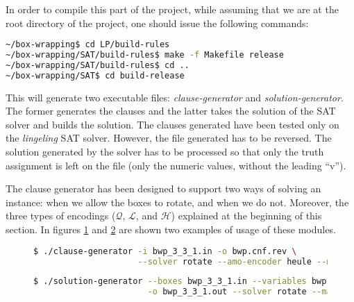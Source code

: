 In order to compile this part of the project, while assuming that we are at the
root directory of the project, one should issue the following commands:
\begin{lstlisting}[language=bash]
~/box-wrapping$ cd LP/build-rules
~/box-wrapping/SAT/build-rules$ make -f Makefile release
~/box-wrapping/SAT/build-rules$ cd ..
~/box-wrapping/SAT$ cd build-release
\end{lstlisting}

This will generate two executable files: \textit{clause-generator} and
\textit{solution-generator}. The former generates the clauses and the latter
takes the solution of the SAT solver and builds the solution. The clauses generated
have been tested only on the \textit{lingeling} SAT solver\cite{lingeling}. However,
the file generated has to be reversed. The solution generated by the solver has to
be processed so that only the truth assignment is left on the file (only the numeric
values, without the leading ``v'').

\hfill

The clause generator has been designed to support two ways of solving an instance:
when we allow the boxes to rotate, and when we do not. Moreover, the three types of
encodings ($\mathcal{Q}$, $\mathcal{L}$, and $\mathcal{H}$) explained at the beginning
of this section. In figures \ref{fig:satisfiability:clause-generator} and
\ref{fig:satisfiability:solution-generator} are shown two examples of usage of these
modules.

\begin{figure}[H]
\centering
\begin{lstlisting}[language=bash,basicstyle=\centering]
$ ./clause-generator -i bwp_3_3_1.in -o bwp.cnf.rev \
					 --solver rotate --amo-encoder heule --max-L 1
\end{lstlisting}
\label{fig:satisfiability:clause-generator}
\end{figure}

\begin{figure}[H]
\centering
\begin{lstlisting}[language=bash,basicstyle=\centering]
$ ./solution-generator --boxes bwp_3_3_1.in --variables bwp.vars \
					   -o bwp_3_3_1.out --solver rotate --max-L 1
\end{lstlisting}
\label{fig:satisfiability:solution-generator}
\end{figure}

